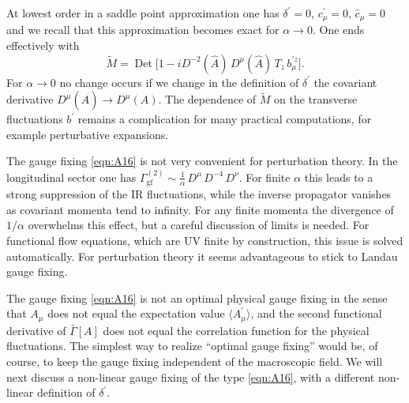 \documentclass[twocolumn,aps,prd,amsmath,amssymb,preprintnumbers,longbibliography]{revtex4-1}
\numberwithin{equation}{section}
\DeclareMathOperator{\Det}{Det}
\begin{document}
\begin{appendices}
At lowest order in a saddle point approximation one has $\delta^\prime = 0$, $c_\mu^\prime = 0$, $\hat{c}_\mu = 0$ and we recall that this approximation becomes exact for $\alpha \to 0$. One ends effectively with
\begin{equation}\label{eqn:214B}
	\tilde{M}
	= \Det\bigl[1 - i D^{-2}(\hat{A}) \, D^\mu(\hat{A}) \, T_z \, b_\mu^{\prime z}\bigr].
\end{equation}
For $\alpha \to 0$ no change occurs if we change in the definition of $\delta^\prime$ the covariant derivative $D^\mu(\hat{A}) \to D^\mu(A)$. The dependence of $\tilde{M}$ on the transverse fluctuations $b^\prime$ remains a complication for many practical computations, for example perturbative expansions.

The gauge fixing \eqref{eqn:A16} is not very convenient for perturbation theory. In the longitudinal sector one has $\Gamma_\text{gf}^{(2)} \sim \frac{1}{\alpha} \, D^\mu \, D^{-4} \, D^\nu$. For finite $\alpha$ this leads to a strong suppression of the IR fluctuations, while the inverse propagator vanishes as covariant momenta tend to infinity. For any finite momenta the divergence of $1/\alpha$ overwhelms this effect, but a careful discussion of limits is needed. For functional flow equations, which are UV finite by construction, this issue is solved automatically. For perturbation theory it seems advantageous to stick to Landau gauge fixing.

The gauge fixing \eqref{eqn:A16} is not an optimal physical gauge fixing in the sense that $A_\mu$ does not equal the expectation value $\langle A_\mu^\prime\rangle$, and the second functional derivative of $\bar\Gamma[A]$ does not equal the correlation function for the physical fluctuations. The simplest way to realize ``optimal gauge fixing'' would be, of course, to keep the gauge fixing independent of the macroscopic field. We will next discuss a non-linear gauge fixing of the type \eqref{eqn:A16}, with a different non-linear definition of $\delta^\prime$.


\end{appendices}
\end{document}

